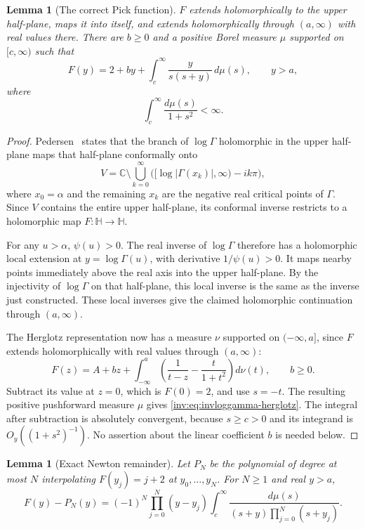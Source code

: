 \documentclass[11pt,a4paper]{article}
\newtheorem{lemma}[theorem]{Lemma}
\theoremstyle{definition}
\theoremstyle{remark}
\numberwithin{equation}{section}
\begin{document}
\begin{lemma}[The correct Pick function]
$F$ extends holomorphically to the upper half-plane, maps it into itself,
and extends holomorphically through $(a,\infty)$ with real values there.
There are $b\geq0$ and a positive Borel measure $\mu$ supported on
$[c,\infty)$ such that
\begin{equation}\label{inv:eq:invloggamma-herglotz}
 F(y)=2+b y+\int_c^{\infty}\frac{y}{s(s+y)}\,d\mu(s),
 \qquad y>a,
\end{equation}
where
\[
 \int_c^{\infty}\frac{d\mu(s)}{1+s^2}<\infty.
\]
\end{lemma}

\begin{proof}
Pedersen~\cite[Section~2, equation~(2)]{Pedersen} states that the branch of
$\log\Gamma$ holomorphic in the upper half-plane maps that half-plane
conformally onto
\[
 V=\mathbb C\setminus
 \bigcup_{k=0}^{\infty}
       \bigl([\log|\Gamma(x_k)|,\infty)-i k\pi\bigr),
\]
where $x_0=\alpha$ and the remaining $x_k$ are the negative real
critical points of $\Gamma$. Since $V$ contains the entire upper
half-plane, its conformal inverse restricts to a holomorphic map
$F:\mathbb H\to\mathbb H$.

For any $u>\alpha$, $\psi(u)>0$. The real inverse of $\log\Gamma$
therefore has a holomorphic local extension at $y=\log\Gamma(u)$,
with derivative $1/\psi(u)>0$. It maps nearby points immediately above
the real axis into the upper half-plane. By the injectivity of
$\log\Gamma$ on that half-plane, this local inverse is the same as the
inverse just constructed. These local inverses give the claimed
holomorphic continuation through $(a,\infty)$.

The Herglotz representation now has a measure $\nu$ supported on
$(-\infty,a]$, since $F$ extends holomorphically with real values
through $(a,\infty)$:
\[
 F(z)=A+bz+
 \int_{-\infty}^{a}
 \left(\frac{1}{t-z}-\frac{t}{1+t^2}\right)d\nu(t),
 \qquad b\geq0.
\]
Subtract its value at $z=0$, which is $F(0)=2$, and use $s=-t$.
The resulting positive pushforward measure $\mu$ gives
\eqref{inv:eq:invloggamma-herglotz}. The integral after subtraction is
absolutely convergent, because $s\geq c>0$ and its integrand is
$O_y((1+s^2)^{-1})$. No assertion about the linear coefficient $b$
is needed below.
\end{proof}

\begin{lemma}[Exact Newton remainder]
Let $P_N$ be the polynomial of degree at most $N$ interpolating
$F(y_j)=j+2$ at $y_0,\ldots,y_N$. For $N\geq1$ and real $y>a$,
\begin{equation}\label{inv:eq:invloggamma-remainder}
 F(y)-P_N(y)
 =(-1)^N\prod_{j=0}^{N}(y-y_j)
   \int_c^{\infty}
   \frac{d\mu(s)}{(s+y)\prod_{j=0}^{N}(s+y_j)}.
\end{equation}
\end{lemma}
\end{document}
